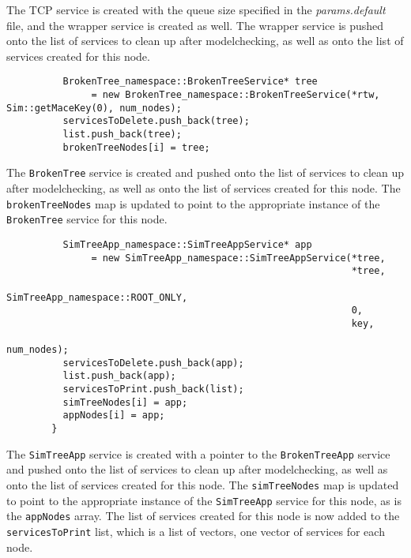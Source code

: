 \documentclass[12pt,letterpaper]{article}
\newenvironment{code}
{\begin{list}{}{\setlength{\leftmargin}{1em}}\item\scriptsize\bfseries}
{\end{list}}
\begin{document}
The TCP service is created with the queue size specified in the \emph{params.default} file, and the wrapper service is created as well.  The wrapper service is pushed onto the list of services to clean up after modelchecking, as well as onto the list of services created for this node.

\begin{code}
\begin{verbatim} 
          BrokenTree_namespace::BrokenTreeService* tree 
               = new BrokenTree_namespace::BrokenTreeService(*rtw, Sim::getMaceKey(0), num_nodes);
          servicesToDelete.push_back(tree);
          list.push_back(tree);
          brokenTreeNodes[i] = tree;
\end{verbatim}
\end{code}

The \texttt{BrokenTree} service is created and pushed onto the list of services to clean up after modelchecking, as well as onto the list of services created for this node.  The \texttt{brokenTreeNodes} map is updated to point to the appropriate instance of the \texttt{BrokenTree} service for this node.

\begin{code}
\begin{verbatim} 
          SimTreeApp_namespace::SimTreeAppService* app 
               = new SimTreeApp_namespace::SimTreeAppService(*tree, 
                                                             *tree, 
                                                             SimTreeApp_namespace::ROOT_ONLY, 
                                                             0, 
                                                             key, 
                                                             num_nodes);
          servicesToDelete.push_back(app);
          list.push_back(app);
          servicesToPrint.push_back(list);
          simTreeNodes[i] = app;
          appNodes[i] = app;
        }
\end{verbatim}
\end{code}

The \texttt{SimTreeApp} service is created with a pointer to the \texttt{BrokenTreeApp} service and pushed onto the list of services to clean up after modelchecking, as well as onto the list of services created for this node.  The \texttt{simTreeNodes} map is updated to point to the appropriate instance of the \texttt{SimTreeApp} service for this node, as is the \texttt{appNodes} array.  The list of services created for this node is now added to the \texttt{servicesToPrint} list, which is a list of vectors, one vector of services for each node.
\end{document}
